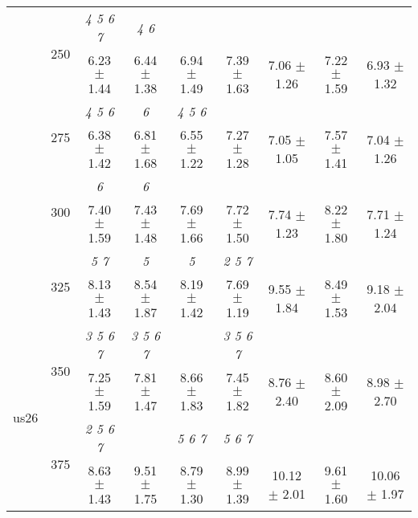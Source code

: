 \begin{table}[h]
{\begin{tabular}{
        ccccccccc}
 & \multirow{2}{*}{250}& \textit{ 4 5 6 7 }& \textit{ 4 6 }& & & & &  \\ 
 & & 6.23 $\pm$ 1.44& 6.44 $\pm$ 1.38& 6.94 $\pm$ 1.49& 7.39 $\pm$ 1.63& 7.06 $\pm$ 1.26& 7.22 $\pm$ 1.59& 6.93 $\pm$ 1.32 \\ 
 & \multirow{2}{*}{275}& \cellcolor[HTML]{EFEFEF} \textit{ 4 5 6 }& \cellcolor[HTML]{EFEFEF} \textit{ 6 }& \cellcolor[HTML]{EFEFEF} \textit{ 4 5 6 }& \cellcolor[HTML]{EFEFEF} & \cellcolor[HTML]{EFEFEF} & \cellcolor[HTML]{EFEFEF} & \cellcolor[HTML]{EFEFEF}  \\ 
 & & \cellcolor[HTML]{EFEFEF} 6.38 $\pm$ 1.42& \cellcolor[HTML]{EFEFEF} 6.81 $\pm$ 1.68& \cellcolor[HTML]{EFEFEF} 6.55 $\pm$ 1.22& \cellcolor[HTML]{EFEFEF} 7.27 $\pm$ 1.28& \cellcolor[HTML]{EFEFEF} 7.05 $\pm$ 1.05& \cellcolor[HTML]{EFEFEF} 7.57 $\pm$ 1.41& \cellcolor[HTML]{EFEFEF} 7.04 $\pm$ 1.26 \\ 
 & \multirow{2}{*}{300}& \textit{ 6 }& \textit{ 6 }& & & & &  \\ 
 & & 7.40 $\pm$ 1.59& 7.43 $\pm$ 1.48& 7.69 $\pm$ 1.66& 7.72 $\pm$ 1.50& 7.74 $\pm$ 1.23& 8.22 $\pm$ 1.80& 7.71 $\pm$ 1.24 \\ 
 & \multirow{2}{*}{325}& \cellcolor[HTML]{EFEFEF} \textit{ 5 7 }& \cellcolor[HTML]{EFEFEF} \textit{ 5 }& \cellcolor[HTML]{EFEFEF} \textit{ 5 }& \cellcolor[HTML]{EFEFEF} \textit{ 2 5 7 }& \cellcolor[HTML]{EFEFEF} & \cellcolor[HTML]{EFEFEF} & \cellcolor[HTML]{EFEFEF}  \\ 
 & & \cellcolor[HTML]{EFEFEF} 8.13 $\pm$ 1.43& \cellcolor[HTML]{EFEFEF} 8.54 $\pm$ 1.87& \cellcolor[HTML]{EFEFEF} 8.19 $\pm$ 1.42& \cellcolor[HTML]{EFEFEF} 7.69 $\pm$ 1.19& \cellcolor[HTML]{EFEFEF} 9.55 $\pm$ 1.84& \cellcolor[HTML]{EFEFEF} 8.49 $\pm$ 1.53& \cellcolor[HTML]{EFEFEF} 9.18 $\pm$ 2.04 \\ 
 \multirow{4}{*}{us26} & \multirow{2}{*}{350}& \textit{ 3 5 6 7 }& \textit{ 3 5 6 7 }& & \textit{ 3 5 6 7 }& & &  \\ 
 & & 7.25 $\pm$ 1.59& 7.81 $\pm$ 1.47& 8.66 $\pm$ 1.83& 7.45 $\pm$ 1.82& 8.76 $\pm$ 2.40& 8.60 $\pm$ 2.09& 8.98 $\pm$ 2.70 \\ 
 & \multirow{2}{*}{375}& \cellcolor[HTML]{EFEFEF} \textit{ 2 5 6 7 }& \cellcolor[HTML]{EFEFEF} & \cellcolor[HTML]{EFEFEF} \textit{ 5 6 7 }& \cellcolor[HTML]{EFEFEF} \textit{ 5 6 7 }& \cellcolor[HTML]{EFEFEF} & \cellcolor[HTML]{EFEFEF} & \cellcolor[HTML]{EFEFEF}  \\ 
 & & \cellcolor[HTML]{EFEFEF} 8.63 $\pm$ 1.43& \cellcolor[HTML]{EFEFEF} 9.51 $\pm$ 1.75& \cellcolor[HTML]{EFEFEF} 8.79 $\pm$ 1.30& \cellcolor[HTML]{EFEFEF} 8.99 $\pm$ 1.39& \cellcolor[HTML]{EFEFEF} 10.12 $\pm$ 2.01& \cellcolor[HTML]{EFEFEF} 9.61 $\pm$ 1.60& \cellcolor[HTML]{EFEFEF} 10.06 $\pm$ 1.97 \\ 

\end{tabular}}
\end{table}

